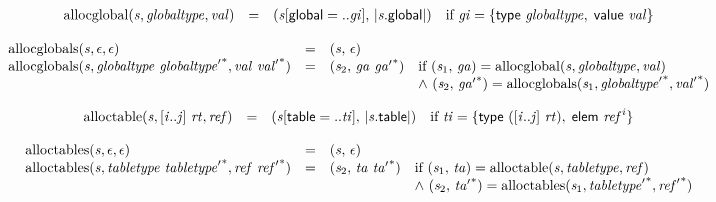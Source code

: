 $$
\begin{array}{@{}lcl@{}l@{}}
{\mathrm{allocglobal}}({\mathit{s}}, {\mathit{globaltype}}, {\mathit{val}}) &=& ({\mathit{s}}{}[\mathsf{global} = ..{\mathit{gi}}],\, {|{\mathit{s}}.\mathsf{global}|}) &\quad
  \mbox{if}~{\mathit{gi}} = \{ \begin{array}[t]{@{}l@{}}
\mathsf{type}~{\mathit{globaltype}},\; \mathsf{value}~{\mathit{val}} \}\end{array} \\
\end{array}
$$

$$
\begin{array}{@{}lcl@{}l@{}}
{\mathrm{allocglobals}}({\mathit{s}}, \epsilon, \epsilon) &=& ({\mathit{s}},\, \epsilon) &  \\
{\mathrm{allocglobals}}({\mathit{s}}, {\mathit{globaltype}}~{{\mathit{globaltype}'}^\ast}, {\mathit{val}}~{{\mathit{val}'}^\ast}) &=& ({\mathit{s}}_{{2}},\, {\mathit{ga}}~{{\mathit{ga}'}^\ast}) &\quad
  \mbox{if}~({\mathit{s}}_{{1}},\, {\mathit{ga}}) = {\mathrm{allocglobal}}({\mathit{s}}, {\mathit{globaltype}}, {\mathit{val}}) \\
 &&&\quad {\land}~({\mathit{s}}_{{2}},\, {{\mathit{ga}'}^\ast}) = {\mathrm{allocglobals}}({\mathit{s}}_{{1}}, {{\mathit{globaltype}'}^\ast}, {{\mathit{val}'}^\ast}) \\
\end{array}
$$

$$
\begin{array}{@{}lcl@{}l@{}}
{\mathrm{alloctable}}({\mathit{s}}, {}[{\mathit{i}} .. {\mathit{j}}]~{\mathit{rt}}, {\mathit{ref}}) &=& ({\mathit{s}}{}[\mathsf{table} = ..{\mathit{ti}}],\, {|{\mathit{s}}.\mathsf{table}|}) &\quad
  \mbox{if}~{\mathit{ti}} = \{ \begin{array}[t]{@{}l@{}}
\mathsf{type}~({}[{\mathit{i}} .. {\mathit{j}}]~{\mathit{rt}}),\; \mathsf{elem}~{{\mathit{ref}}^{{\mathit{i}}}} \}\end{array} \\
\end{array}
$$

$$
\begin{array}{@{}lcl@{}l@{}}
{\mathrm{alloctables}}({\mathit{s}}, \epsilon, \epsilon) &=& ({\mathit{s}},\, \epsilon) &  \\
{\mathrm{alloctables}}({\mathit{s}}, {\mathit{tabletype}}~{{\mathit{tabletype}'}^\ast}, {\mathit{ref}}~{{\mathit{ref}'}^\ast}) &=& ({\mathit{s}}_{{2}},\, {\mathit{ta}}~{{\mathit{ta}'}^\ast}) &\quad
  \mbox{if}~({\mathit{s}}_{{1}},\, {\mathit{ta}}) = {\mathrm{alloctable}}({\mathit{s}}, {\mathit{tabletype}}, {\mathit{ref}}) \\
 &&&\quad {\land}~({\mathit{s}}_{{2}},\, {{\mathit{ta}'}^\ast}) = {\mathrm{alloctables}}({\mathit{s}}_{{1}}, {{\mathit{tabletype}'}^\ast}, {{\mathit{ref}'}^\ast}) \\
\end{array}
$$

